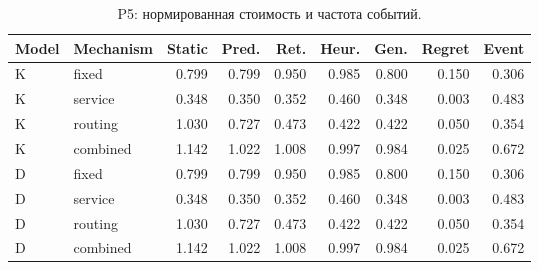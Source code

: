 \begin{table}[htbp]\caption{P5: нормированная стоимость и частота событий.}\centering\small\setlength{\tabcolsep}{3pt}

\begin{tabular}{llrrrrrrr}\toprule

Model & Mechanism & Static & Pred. & Ret. & Heur. & Gen. & Regret & Event\\\midrule

K & fixed & 0.799 & 0.799 & 0.950 & 0.985 & 0.800 & 0.150 & 0.306\\

K & service & 0.348 & 0.350 & 0.352 & 0.460 & 0.348 & 0.003 & 0.483\\

K & routing & 1.030 & 0.727 & 0.473 & 0.422 & 0.422 & 0.050 & 0.354\\

K & combined & 1.142 & 1.022 & 1.008 & 0.997 & 0.984 & 0.025 & 0.672\\

D & fixed & 0.799 & 0.799 & 0.950 & 0.985 & 0.800 & 0.150 & 0.306\\

D & service & 0.348 & 0.350 & 0.352 & 0.460 & 0.348 & 0.003 & 0.483\\

D & routing & 1.030 & 0.727 & 0.473 & 0.422 & 0.422 & 0.050 & 0.354\\

D & combined & 1.142 & 1.022 & 1.008 & 0.997 & 0.984 & 0.025 & 0.672\\

\bottomrule\end{tabular}\end{table}

